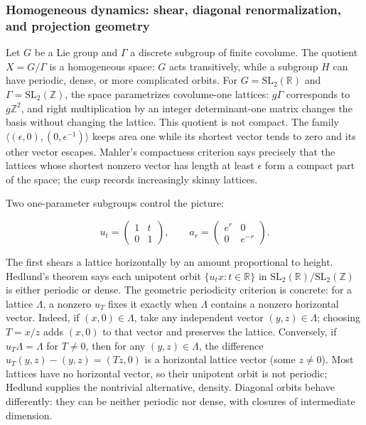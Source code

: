 \subsubsection{Homogeneous dynamics: shear, diagonal renormalization, and projection geometry}\label{04-visual-computing-ii-ch033-homogeneous-dynamics-shear-diagonal-renormalization-and-projection-geometry}

\hypertarget{04-visual-computing-ii-ch033-homogeneous-dynamics-shear-diagonal-renormalization-and-projection-geometry}{}

Let \(G\) be a Lie group and \(\Gamma\) a discrete subgroup of finite covolume. The quotient \(X=G/\Gamma\) is a homogeneous space: \(G\) acts transitively, while a subgroup \(H\) can have periodic, dense, or more complicated orbits. For \(G=\mathrm{SL}_2(\mathbb R)\) and \(\Gamma=\mathrm{SL}_2(\mathbb Z)\), the space parametrizes covolume-one lattices: \(g\Gamma\) corresponds to \(g\mathbb Z^2\), and right multiplication by an integer determinant-one matrix changes the basis without changing the lattice. This quotient is not compact. The family \(\langle(\epsilon,0),(0,\epsilon^{-1})\rangle\) keeps area one while its shortest vector tends to zero and its other vector escapes. Mahler's compactness criterion says precisely that the lattices whose shortest nonzero vector has length at least \(\epsilon\) form a compact part of the space; the cusp records increasingly skinny lattices.

Two one-parameter subgroups control the picture:

\[ u_t=\begin{pmatrix}1&t\\0&1\end{pmatrix},\qquad a_r=\begin{pmatrix}e^r&0\\0&e^{-r}\end{pmatrix}. \]

The first shears a lattice horizontally by an amount proportional to height. Hedlund's theorem says each unipotent orbit \(\{u_t x:t\in\mathbb R\}\) in \(\mathrm{SL}_2(\mathbb R)/\mathrm{SL}_2(\mathbb Z)\) is either periodic or dense. The geometric periodicity criterion is concrete: for a lattice \(\Lambda\), a nonzero \(u_T\) fixes it exactly when \(\Lambda\) contains a nonzero horizontal vector. Indeed, if \((x,0)\in\Lambda\), take any independent vector \((y,z)\in\Lambda\); choosing \(T=x/z\) adds \((x,0)\) to that vector and preserves the lattice. Conversely, if \(u_T\Lambda=\Lambda\) for \(T\neq0\), then for any \((y,z)\in\Lambda\), the difference \(u_T(y,z)-(y,z)=(Tz,0)\) is a horizontal lattice vector (some \(z\neq0\)). Most lattices have no horizontal vector, so their unipotent orbit is not periodic; Hedlund supplies the nontrivial alternative, density. Diagonal orbits behave differently: they can be neither periodic nor dense, with closures of intermediate dimension.

